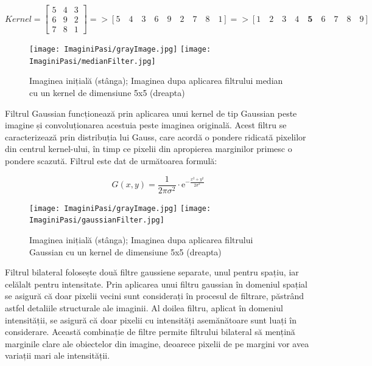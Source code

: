 \documentclass[12pt]{article}
\begin{document}
\begin{equation}
        Kernel=\begin{bmatrix}
        5 & 4 & 3 \\
        6 & 9 & 2 \\
        7 & 8 & 1 
    \end{bmatrix} => [5 \quad 4 \quad  3 \quad  6 \quad  9 \quad  2 \quad 7 \quad 8 \quad  1] => [1 \quad 2 \quad  3 \quad  4 \quad  \mathbf{5} \quad  6 \quad 7 \quad 8 \quad  9]
\end{equation}

\begin{figure}[H]
  \centering
  \texttt{[image: ImaginiPasi/grayImage.jpg]}\hfill
  \texttt{[image: ImaginiPasi/medianFilter.jpg]}
  \caption{Imaginea inițial\u{a} (st\^{a}nga); Imaginea dupa aplicarea filtrului median cu un kernel de dimensiune 5x5 (dreapta)}
  \label{fig:filtrul_median}
\end{figure}

Filtrul Gaussian funcționeaz\u{a} prin aplicarea unui kernel de tip Gaussian peste imagine și convoluționarea acestuia peste imaginea original\u{a}. Acest filtru se caracterizeaz\u{a} prin distribuția lui Gauss, care acord\u{a} o pondere ridicat\u{a} pixelilor din centrul kernel-ului, \^{i}n timp ce pixelii din apropierea marginilor primesc o pondere scazut\u{a}. Filtrul este dat de urm\u{a}toarea formul\u{a}:

\begin{equation}
    G(x,y) = \frac{1}{2\pi\sigma^2} \cdot \mathrm{e}^{-\frac{x^2+y^2}{2\sigma^2}}
\end{equation}

\begin{figure}[H]
  \centering
  \texttt{[image: ImaginiPasi/grayImage.jpg]}\hfill
  \texttt{[image: ImaginiPasi/gaussianFilter.jpg]}
  \caption{Imaginea inițial\u{a} (st\^{a}nga); Imaginea dupa aplicarea filtrului Gaussian cu un kernel de dimensiune 5x5 (dreapta)}
  \label{fig:filtrul_gaussian}
\end{figure}

Filtrul bilateral folosește dou\u{a} filtre gaussiene separate, unul pentru spațiu, iar cel\u{a}lalt pentru intensitate. Prin aplicarea unui filtru gaussian \^{i}n domeniul spațial se asigur\u{a} c\u{a} doar pixelii vecini sunt considerați \^{i}n procesul de filtrare, p\u{a}str\^{a}nd astfel detaliile structurale ale imaginii. Al doilea filtru, aplicat \^{i}n domeniul intensit\u{a}ții, se asigur\u{a} c\u{a} doar pixelii cu intensit\u{a}ți asem\u{a}n\u{a}toare sunt luați \^{i}n considerare. Aceast\u{a} combinație de filtre permite filtrului bilateral s\u{a} mențin\u{a} marginile clare ale obiectelor din imagine, deoarece pixelii de pe margini vor avea variații mari ale intensit\u{a}ții.
\end{document}
